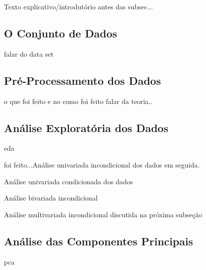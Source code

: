 Texto explicativo/introdutório antes das subsec...
\subsection{O Conjunto de Dados}
falar do data set

\subsection{Pré-Processamento dos Dados}
o que foi feito e no como foi feito falar da teoria..

\subsection{Análise Exploratória dos Dados}
\ac{eda}

foi feito...Análise univariada incondicional dos dados em seguida.

Análise univariada condicionada dos dados

Análise bivariada incondicional

Análise multivariada incondicional discutida na próxima subseção

\subsection{Análise das Componentes Principais}
\ac{pca}